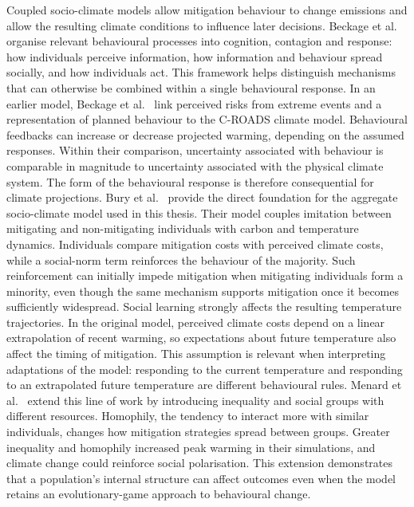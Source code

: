 Coupled socio-climate models allow mitigation behaviour to change emissions and allow the resulting
climate conditions to influence later decisions. Beckage et al.~\cite{beckage2022incorporating} organise
relevant behavioural processes into cognition, contagion and response: how individuals perceive
information, how information and behaviour spread socially, and how individuals act. This framework helps
distinguish mechanisms that can otherwise be combined within a single behavioural response. In an earlier
model, Beckage et al.~\cite{beckage2018linking} link perceived risks from extreme events and a
representation of planned behaviour to the C-ROADS climate model. Behavioural feedbacks can increase or
decrease projected warming, depending on the assumed responses. Within their comparison, uncertainty
associated with behaviour is comparable in magnitude to uncertainty associated with the physical climate
system. The form of the behavioural response is therefore consequential for climate projections. Bury et
al.~\cite{bury2019pathways} provide the direct foundation for the aggregate socio-climate model used in
this thesis. Their model couples imitation between mitigating and non-mitigating individuals with carbon
and temperature dynamics. Individuals compare mitigation costs with perceived climate costs, while a
social-norm term reinforces the behaviour of the majority. Such reinforcement can initially impede
mitigation when mitigating individuals form a minority, even though the same mechanism supports
mitigation once it becomes sufficiently widespread. Social learning strongly affects the resulting
temperature trajectories. In the original model, perceived climate costs depend on a linear extrapolation
of recent warming, so expectations about future temperature also affect the timing of mitigation. This
assumption is relevant when interpreting adaptations of the model: responding to the current temperature
and responding to an extrapolated future temperature are different behavioural rules. Menard et
al.~\cite{menard2021conflicts} extend this line of work by introducing inequality and social groups with
different resources. Homophily, the tendency to interact more with similar individuals, changes how
mitigation strategies spread between groups. Greater inequality and homophily increased peak warming in
their simulations, and climate change could reinforce social polarisation. This extension demonstrates
that a population's internal structure can affect outcomes even when the model retains an
evolutionary-game approach to behavioural change.

